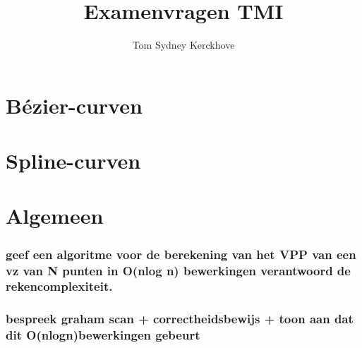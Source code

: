 \documentclass[12pt,a4paper]{article}
\author{Tom Sydney Kerckhove}
\title{Examenvragen TMI}
\begin{document}
\pagebreak





\part{B\'ezier-curven}




\iffalse
\section{Bespreek subdivisie en geef de methode.}
\section{Bespreek graadverhoding, geef het bewijs en leg uit waarvoor het dient.}
\section{Bespreek tensorproductoppervlakken aan de hand van B\'ezier-oppervlakken.}
\section{Bereken de tweede partiele afgeleide in de hoekpunten van een B\'ezier-oppervlak, leg uit en geef grafisch weer.}
\fi

\part{Spline-curven}






\part{Algemeen}



\iffalse

\section{geef een algoritme voor de berekening van het VPP van een vz van N punten in O(nlog n) bewerkingen verantwoord de rekencomplexiteit.}
\section{bespreek graham scan + correctheidsbewijs + toon aan dat dit O(nlogn)bewerkingen gebeurt}
\end{document}
